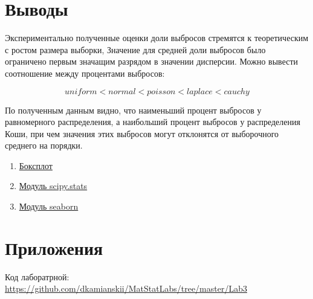 \documentclass[a4]{article}
\begin{document}
\section{Выводы}
\par Экспериментально полученные оценки доли выбросов стремятся к теоретическим с ростом размера выборки, Значение для средней доли выбросов было ограничено первым значащим разрядом в значении дисперсии.
Можно вывести соотношение между процентами выбросов:

\begin{equation}
uniform<normal<poisson<laplace<cauchy
\end{equation}

\par По полученным данным видно, что наименьший процент выбросов у равномерного распределения, а наибольший процент выбросов у распределения Коши, при чем значения этих выбросов могут отклонятся от выборочного среднего на порядки.

\begin{thebibliography}{}
	\begin{enumerate}
		\item \href{https://en.wikipedia.org/wiki/Box\_plot}{Боксплот}
		\item \href{https://docs.scipy.org/doc/scipy/reference/stats.html}{Модуль scipy.stats}
		\item \href{https://seaborn.pydata.org/}{Модуль seaborn}
	\end{enumerate}    
\end{thebibliography}

\section{Приложения}


Код лаборатрной:\; \url{https://github.com/dkamianskii/MatStatLabs/tree/master/Lab3}
\end{document}
